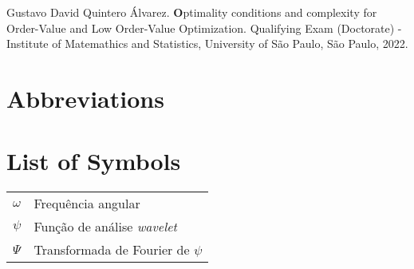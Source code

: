 \documentclass[11pt,oneside,a4paper]{book}
\newcommand{\autor}{Gustavo David Quintero Álvarez}
\newcommand{\titulo}{Optimality conditions and complexity for Order-Value and Low Order-Value Optimization}
\begin{document}
\afterpage{\blankpage}
\clearpage %
\thispagestyle{empty}
  \begin{flushleft}
    \setlength{\parskip}{0pt}
    { \par} 
    \bigskip
		\begin{center}
\noindent\begin{minipage}{0.75\textwidth}
\small{\autor. \textbf\titulo. 
Qualifying Exam (Doctorate) - Institute of Matemathics and Statistics,
University of São Paulo, São Paulo, 2022.}
\end{minipage}
\end{center}
\end{flushleft}
\bigskip


\let\cleardoublepage\clearpage
\tableofcontents

\listoffigures %

\listoftables %


\chapter*{Abbreviations}

\chapter*{List of Symbols}
\begin{tabular}{ll}
        $\omega$    & Frequência angular\\
        $\psi$      & Função de análise \emph{wavelet}\\
        $\Psi$      & Transformada de Fourier de $\psi$\\
\end{tabular}
\end{document}
